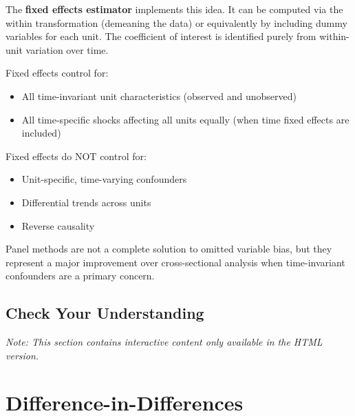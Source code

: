 \documentclass[
  letterpaper,
  DIV=11,
  numbers=noendperiod]{scrreprt}
\providecommand{\tightlist}{%
  \setlength{\itemsep}{0pt}\setlength{\parskip}{0pt}}
\begin{document}
The \textbf{fixed effects estimator} implements this idea. It can be
computed via the within transformation (demeaning the data) or
equivalently by including dummy variables for each unit. The coefficient
of interest is identified purely from within-unit variation over time.

Fixed effects control for:

\begin{itemize}
\tightlist
\item
  All time-invariant unit characteristics (observed and unobserved)
\item
  All time-specific shocks affecting all units equally (when time fixed
  effects are included)
\end{itemize}

Fixed effects do NOT control for:

\begin{itemize}
\tightlist
\item
  Unit-specific, time-varying confounders
\item
  Differential trends across units
\item
  Reverse causality
\end{itemize}

Panel methods are not a complete solution to omitted variable bias, but
they represent a major improvement over cross-sectional analysis when
time-invariant confounders are a primary concern.

\section{Check Your Understanding}\label{check-your-understanding-9}

\emph{Note: This section contains interactive content only available in
the HTML version.}


\chapter{Difference-in-Differences}\label{sec-did}
\end{document}
